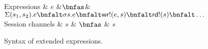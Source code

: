 \begin{figure}
  \begin{grammar}
    Expressions
    & $e$
        &$\bnfas$&
        $\Sigma (s_1, s_2) . e \bnfalt \sigma s . e \bnfalt \mathsf{wr!}(e, s) \bnfalt
    \mathsf{rd!}(s) \bnfalt \ldots$
  \\[1ex]    
  Session channels
  & $s$
      & $\bnfas$ & $s$
  \end{grammar}
  \caption{Syntax of extended expressions.}
  \label{fig:session-syntax}
\end{figure}

\begin{comment}
\begin{figure}[htbp]
  \centering
\begin{grammar}
  Processes
  & $P$
      &$\bnfas$&
      $e$ & Expression
      \\ &&& $\bnfaltbrk \Sigma c. P$ & Allocate session channel as $c$ in $P$
      \\ &&& $\bnfaltbrk \sigma c. P$ & Distribute session channel as $c$ in $P$
      \\ &&& $\bnfaltbrk \mathsf{wr!}(c, e)$ & Write session channel $c$
      \\ &&& $\bnfaltbrk \mathsf{rd!}(c)$ & Read session channel $c$
      \\ &&& $\bnfaltbrk P_1 *&& P_2$ & Fork~$P_1$, continue as~$P_2$
      \\ &&& $\bnfaltbrk P_1 *|| P_2$ & External choice between~$P_1$ and~$P_2$
      \\ &&& $\bnfaltbrk \eNu{x}{P}$ & Allocate local channel as~$x$ in~$P$
      \\ &&& $\bnfaltbrk \eWr{e_1}{e_2}$ & Write local channel
      \\ &&& $\bnfaltbrk \eRd{e}$ & Read local channel
      \\ &&& $\bnfaltbrk \mathsf{def}({P_1, x.P_2})$ & Recursion
  \\[1ex]    
  Expressions
  & $e$
      & $\bnfas$ & $x$ & Variable
      \\ &&& $\bnfaltbrk \vUnit$ & Unit value
      \\ &&& $\bnfaltbrk n$         & Natural number
      \\ &&& $\bnfaltbrk \vPair{v_1}{v_2}$ & Pair of values
      \\ &&& $\bnfaltbrk \vInj{i}{v}$ & Injected value
      \\ &&& $\bnfaltbrk \vChan{c}$ & Channel (either read or write end)
      \\ &&& $\bnfaltbrk \vThunk{e}$ & Thunk (suspended, closed expression)

\end{comment}
